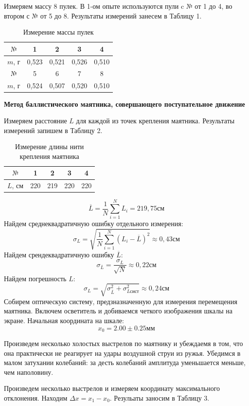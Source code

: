 \documentclass[a4paper,12pt]{article} %
\begin{document}
Измеряем массу 8 пулек. В 1-ом опыте используются пули c $\text{№}$ от 1 до 4, во втором с $\text{№}$ от 5 до 8. Результаты измерений занесем в Таблицу 1.
\newpage
\begin{table}[h]
\centering
\caption{Измерение массы пулек}
\begin{tabular}{|c|c|c|c|c|}
\hline
$\text{№}$  & 1 & 2 & 3 & 4  \\ \hline
$m$, г & 0,523 & 0,521 & 0,526 & 0,510 \\ \hline \hline
$\text{№}$  & 5 & 6 & 7 & 8  \\ \hline
$m$, г & 0,524 & 0,507 & 0,520 & 0,510 \\ \hline 
\end {tabular}
\end {table}
\textbf{Метод баллистического маятника, совершающего поступательное движение}

Измеряем расстояние $L$ для каждой из точек крепления маятника. Результаты измерений запишем в Таблицу 2.
\begin{table}[h]
\centering
\caption{Измерение длины нити крепления маятника}
\begin{tabular}{|c|c|c|c|c|}
\hline
$\text{№}$  & 1 & 2 & 3 & 4  \\ \hline
$L$, см & 220 & 219 & 220 & 220 \\ \hline
\end {tabular}
\end {table}
\[\overline L = \frac{1}{N}\sum_{i=1}^NL_i = 219,75 \text{см}\]
Найдем среднеквадратичную ошибку отдельного измерения:
\[\sigma_L = \sqrt{\frac{1}{N}\sum_{i=1}^N(L_i-\overline{L})^2} \approx 0,43\text{см}\]
Найдем срендеквадратичную ошибку $\overline{L}$:
\[\sigma_{\overline L} = \frac{\sigma_L}{\sqrt{N}}\approx 0,22\text{см}\]
Найдем погрешность $L$:
\[\sigma_L = \sqrt{\sigma_{\overline{L}}^2+\sigma_{L\text{сист}}^2}\approx0,24\text{см}\]
Собирем оптическую систему, предзназначенную для измерения перемещения маятника. Включем осветитель и добиваемся четкого изображения шкалы на экране. Начальная координата на шкале: \[x_0 = 2.00\pm0.25\text{мм}\]

Произведем несколько холостых выстрелов по маятнику и убеждаемя в том, что она практически не реагирует на удары воздушной струи из ружья.
\newpage
Убедимся в малом затухании колебаний: за десть колебаний амплитуда уменьшается меньше, чем наполовину.

Произведем несколько выстрелов и измеряем координату максимального отклонения. Находим $\Delta x = x_1-x_0$. Резульаты заносим в Таблицу 3.
\end{document}
